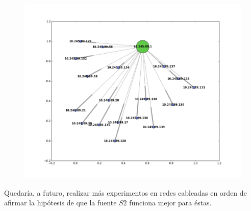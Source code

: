 \begin{figure}[htbp]
\hspace*{-2cm}                                                           
\includegraphics[scale=0.6]{imagenes/analisisTCORPcableada/cableada-12.png} 
\end{figure}

Quedaría, a futuro, realizar más experimentos en redes cableadas en orden de afirmar la hipótesis de que la fuente $S2$ funciona mejor para éstas.







